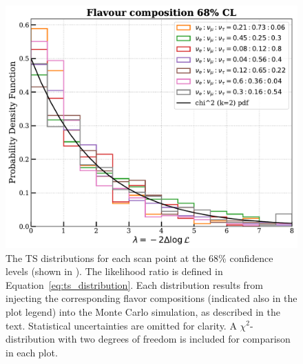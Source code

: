\begin{figure}[h!]
    
    \includegraphics{./figures/results/wilkscheck_68CL.pdf}


    \caption[The TS distributions for each scan point at the 68\% confidence levels (shown in )]{The TS distributions for each scan point at the 68\% confidence levels (shown in ). The likelihood ratio is defined in Equation~\ref{eq:ts_distribution}. Each distribution results from injecting the corresponding flavor compositions (indicated also in the plot legend) into the Monte Carlo simulation, as described in the text. Statistical uncertainties are omitted for clarity. A $\chi^2$-distribution with two degrees of freedom is included for comparison in each plot.}
\end{figure}

